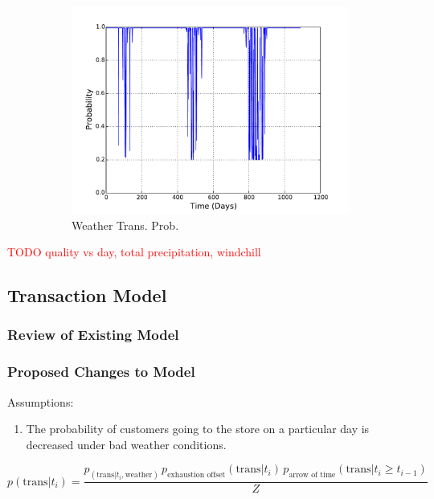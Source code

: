 \documentclass[11pt, letterpaper]{article}
\begin{document}
\begin{figure}[H]
\begin{subfigure}[b]{0.45\textwidth}
    \includegraphics[width=\textwidth]{figures/weather_trans_prob.pdf}
    \caption{Weather Trans. Prob.}
  \end{subfigure}
  \label{fig:analysis}
  \caption{}
\end{figure}



\textcolor{red}{TODO quality vs day, total precipitation, windchill}

\subsection{Transaction Model}

\subsubsection{Review of Existing Model}

\subsubsection{Proposed Changes to Model}

Assumptions:
\begin{enumerate}
\item The probability of customers going to the store on a particular day is decreased under bad weather conditions.
\end{enumerate}

\begin{equation}
p(\text{trans} | t_i) = \frac{p_(\text{trans} | t_i, \text{weather}) \, p_{\text{exhaustion offset}}(\text{trans} | t_i) \, p_{\text{arrow of time}}(\text{trans} | t_i \geq t_{i-1})}{Z}
\end{equation}
\end{document}
